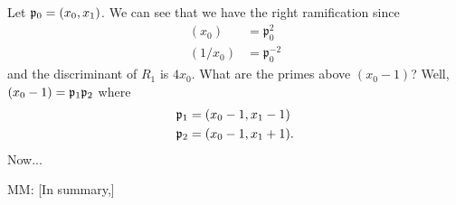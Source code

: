 \documentclass[oneside, reqno, 12pt]{amsart}
\theoremstyle{definition}
\theoremstyle{remark}
\newcommand{\mm}[1]{{\color{blue} \sf MM: [#1]}}
\begin{document}
{{\begin{center}
    \end{center}
    Let $\frak{p}_0 = (x_0, x_1)$.
    We can see that we have the right ramification
    since
    \begin{align*}
      (x_0) &= \mathfrak{p}_0^2\\
      (1/x_0) &= \mathfrak{p}_0^{-2}
    \end{align*}
    and the discriminant of $R_1$ is $4x_0$.
    What are the primes above $(x_0-1)$?
    Well, $(x_0-1) = \frak{p}_1\frak{p}_2$
    where
    \begin{align*}
      \frak{p}_1 &= (x_0-1, x_1-1)\\
      \frak{p}_2 &= (x_0-1, x_1+1).
    \end{align*}
    Now...
    \par
    \mm{In summary,}
    \begin{center}
    \end{center}
  }
}
\nocite{*}


\end{document}
